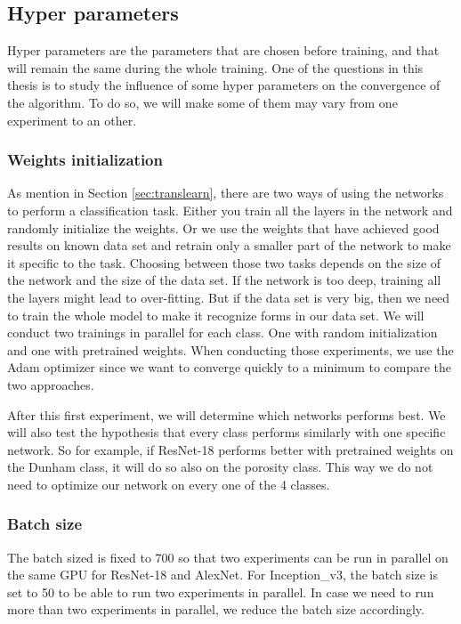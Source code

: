 \subsection{Hyper parameters}
Hyper parameters are the parameters that are chosen before training, and that will remain the same during the whole training. One of the questions in this thesis is to study the influence of some hyper parameters on the  convergence of the algorithm. To do so, we will make some of them may vary from one experiment to an other. 


\subsubsection{Weights initialization} \label{sec:init}
As mention in Section \ref{sec:translearn}, there are two ways of using the networks to perform a classification task. Either you train all the layers in the network and randomly initialize the weights. Or we use the weights that have achieved good results on known data set and retrain only a smaller part of the network to make it specific to the task.
Choosing between those two tasks depends on the size of the network and the size of the data set. If the network is too deep, training all the layers might lead to over-fitting. But if the data set is very big, then we need to train the whole model to make it recognize forms in our data set. 
We will conduct two trainings in parallel for each class. One with random initialization and one with pretrained weights. 
When conducting those experiments, we use the Adam optimizer since we want to converge quickly to a minimum to compare the two approaches. 

After this first experiment, we will determine which networks performs best. We will also test the hypothesis that every class performs similarly with one specific network. So for example, if ResNet-18 performs better with pretrained weights on the Dunham class, it will do so also on the porosity class. This way we do not need to optimize our network on every one of the 4 classes. 

\subsubsection{Batch size}
The batch sized is fixed to 700 so that two experiments can be run in parallel on the same GPU for ResNet-18 and AlexNet. For Inception\_v3, the batch size is set to 50 to be able to run two experiments in parallel. In case we need to run more than two experiments in parallel, we reduce the batch size accordingly.

